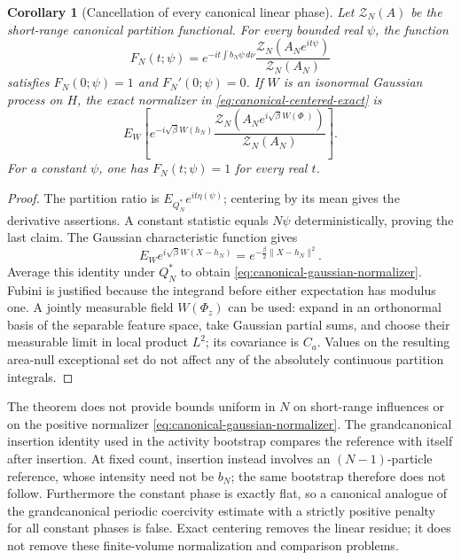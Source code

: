 \documentclass[11pt]{article}
\newtheorem{corollary}[theorem]{Corollary}
\theoremstyle{remark}\newtheorem{remark}[theorem]{Remark}
\begin{document}
\begin{corollary}[Cancellation of every canonical linear phase]
\label{cor:canonical-phase-centering}
Let $\mathcal Z_N(A)$ be the short-range canonical partition functional.
For every bounded real $\psi$, the function
\[
 F_N(t;\psi)=e^{-it\int b_N\psi\,d\nu}
               \frac{\mathcal Z_N(A_Ne^{it\psi})}
                    {\mathcal Z_N(A_N)}
\]
satisfies $F_N(0;\psi)=1$ and $F_N'(0;\psi)=0$.
If $W$ is an isonormal Gaussian process on $H$, the exact normalizer in
\eqref{eq:canonical-centered-exact} is
\begin{equation}\label{eq:canonical-gaussian-normalizer}
 E_W\left[e^{-i\sqrt\beta W(h_N)}
       \frac{\mathcal Z_N(A_Ne^{i\sqrt\beta W(\Phi_\cdot)})}
            {\mathcal Z_N(A_N)}\right].
\end{equation}
For a constant $\psi$, one has $F_N(t;\psi)=1$ for every real $t$.
\end{corollary}
\begin{proof}
The partition ratio is $E_{Q_N^*}e^{it\eta(\psi)}$; centering by
its mean gives the derivative assertions. A constant statistic equals
$N\psi$ deterministically, proving the last claim.
The Gaussian characteristic function gives
\[
 E_W e^{i\sqrt\beta W(X-h_N)}
       =e^{-\frac\beta2\|X-h_N\|^2}.
\]
Average this identity under $Q_N^*$ to obtain
\eqref{eq:canonical-gaussian-normalizer}. Fubini is justified because
the integrand before either expectation has modulus one. A jointly
measurable field $W(\Phi_z)$ can be used: expand in an orthonormal basis
of the separable feature space, take Gaussian partial sums, and choose
their measurable limit in local product $L^2$; its covariance is $C_a$.
Values on the resulting area-null exceptional set do not affect any
of the absolutely continuous partition integrals.
\end{proof}

The theorem does not provide bounds uniform in $N$ on short-range
influences or on the positive normalizer
\eqref{eq:canonical-gaussian-normalizer}. The grandcanonical insertion
identity used in the activity bootstrap compares the reference with
itself after insertion. At fixed count, insertion instead involves an
$(N-1)$-particle reference, whose intensity need not be $b_N$; the
same bootstrap therefore does not follow. Furthermore the constant
phase is exactly flat, so a canonical analogue of the grandcanonical
periodic coercivity estimate with a strictly positive penalty for all
constant phases is false. Exact centering removes the linear residue;
it does not remove these finite-volume normalization and comparison
problems.
\end{document}
